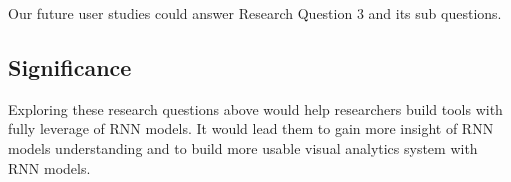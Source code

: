 Our future user studies could answer Research Question 3 and its sub questions. 

\subsection{Significance}


Exploring these research questions above would help researchers build tools with fully leverage of RNN models. It would lead them to gain more insight of RNN models understanding and to build more usable visual analytics system with RNN models. 

%  
%
%    





